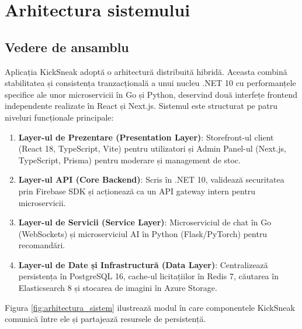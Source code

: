 \chapter{Arhitectura sistemului}

\section{Vedere de ansamblu}

Aplicația KickSneak adoptă o arhitectură distribuită hibridă. Aceasta combină stabilitatea și consistența tranzacțională a unui nucleu .NET 10 cu performanțele specifice ale unor microservicii în Go și Python, deservind două interfețe frontend independente realizate în React și Next.js. Sistemul este structurat pe patru niveluri funcționale principale:
\begin{enumerate}
    \item \textbf{Layer-ul de Prezentare (Presentation Layer)}: Storefront-ul client (React 18, TypeScript, Vite) pentru utilizatori și Admin Panel-ul (Next.js, TypeScript, Prisma) pentru moderare și management de stoc.
    \item \textbf{Layer-ul API (Core Backend)}: Scris în .NET 10, validează securitatea prin Firebase SDK și acționează ca un API gateway intern pentru microservicii.
    \item \textbf{Layer-ul de Servicii (Service Layer)}: Microserviciul de chat în Go (WebSockets) și microserviciul AI în Python (Flask/PyTorch) pentru recomandări.
    \item \textbf{Layer-ul de Date și Infrastructură (Data Layer)}: Centralizează persistența în PostgreSQL 16, cache-ul licitațiilor în Redis 7, căutarea în Elasticsearch 8 și stocarea de imagini în Azure Storage.
\end{enumerate}

Figura \ref{fig:arhitectura_sistem} ilustrează modul în care componentele KickSneak comunică între ele și partajează resursele de persistență.

